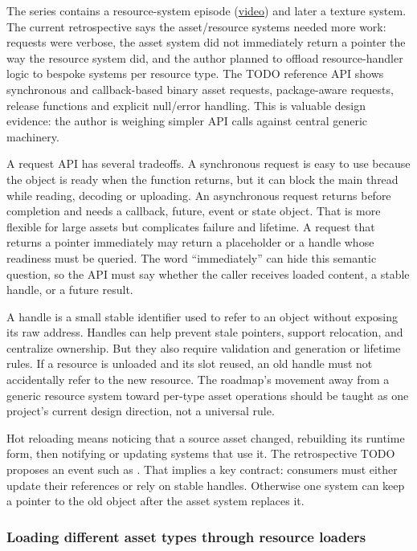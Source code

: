 The series contains a resource-system episode (\href{https://www.youtube.com/watch?v=ubin1HH_kqw}{video}) and later a texture system. The current retrospective says the asset/resource systems needed more work: requests were verbose, the asset system did not immediately return a pointer the way the resource system did, and the author planned to offload resource-handler logic to bespoke systems per resource type. The TODO reference API shows synchronous and callback-based binary asset requests, package-aware requests, release functions and explicit null/error handling. This is valuable design evidence: the author is weighing simpler API calls against central generic machinery.

A request API has several tradeoffs. A synchronous request is easy to use because the object is ready when the function returns, but it can block the main thread while reading, decoding or uploading. An asynchronous request returns before completion and needs a callback, future, event or state object. That is more flexible for large assets but complicates failure and lifetime. A request that returns a pointer immediately may return a placeholder or a handle whose readiness must be queried. The word ``immediately'' can hide this semantic question, so the API must say whether the caller receives loaded content, a stable handle, or a future result.

A handle is a small stable identifier used to refer to an object without exposing its raw address. Handles can help prevent stale pointers, support relocation, and centralize ownership. But they also require validation and generation or lifetime rules. If a resource is unloaded and its slot reused, an old handle must not accidentally refer to the new resource. The roadmap's movement away from a generic resource system toward per-type asset operations should be taught as one project's current design direction, not a universal rule.

Hot reloading means noticing that a source asset changed, rebuilding its runtime form, then notifying or updating systems that use it. The retrospective TODO proposes an event such as . That implies a key contract: consumers must either update their references or rely on stable handles. Otherwise one system can keep a pointer to the old object after the asset system replaces it.

\subsubsection{Loading different asset types through resource loaders}\label{06-engine-ii-ch027-loading-different-asset-types-through-resource-loaders}

